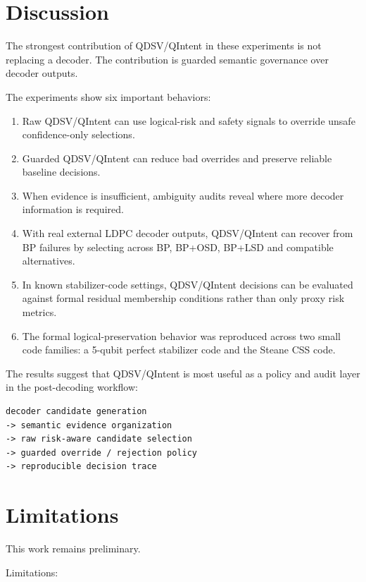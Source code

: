 \documentclass[11pt]{article}
\begin{document}
\section{Discussion}

The strongest contribution of QDSV/QIntent in these experiments is not replacing a decoder. The contribution is guarded semantic governance over decoder outputs.


The experiments show six important behaviors:


\begin{enumerate}[leftmargin=*]
\item Raw QDSV/QIntent can use logical-risk and safety signals to override unsafe confidence-only selections.
\item Guarded QDSV/QIntent can reduce bad overrides and preserve reliable baseline decisions.
\item When evidence is insufficient, ambiguity audits reveal where more decoder information is required.
\item With real external LDPC decoder outputs, QDSV/QIntent can recover from BP failures by selecting across BP, BP+OSD, BP+LSD and compatible alternatives.
\item In known stabilizer-code settings, QDSV/QIntent decisions can be evaluated against formal residual membership conditions rather than only proxy risk metrics.
\item The formal logical-preservation behavior was reproduced across two small code families: a 5-qubit perfect stabilizer code and the Steane CSS code.
\end{enumerate}

The results suggest that QDSV/QIntent is most useful as a policy and audit layer in the post-decoding workflow:


\begin{lstlisting}
decoder candidate generation
-> semantic evidence organization
-> raw risk-aware candidate selection
-> guarded override / rejection policy
-> reproducible decision trace
\end{lstlisting}

\section{Limitations}

This work remains preliminary.


Limitations:
\end{document}
